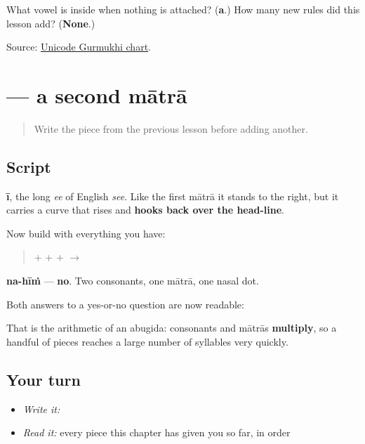 \begin{tcolorbox}[breakable,colback=teal!4,colframe=teal!35!black,title={Before you move on}]
What vowel is inside \textbf{} when nothing is attached? (\textbf{a}.) How many new rules did this lesson add? (\textbf{None}.)

Source: \href{https://www.unicode.org/charts/PDF/U0A00.pdf}{Unicode Gurmukhi chart}.
\end{tcolorbox}
\section[\texorpdfstring{\pa{ੀ} (-ī)}{ੀ (-ī)}]{ — a second mātrā}

\label{lesson:PA-W01-ii-matra}



\begin{quote}
Write the piece from the previous lesson before adding another.
\end{quote}

\subsection*{Script}
\begin{quote}
\end{quote}

\textbf{ī}, the long \emph{ee} of English \emph{see}. Like the first mātrā it stands to the right, but it carries a curve that rises and \textbf{hooks back over the head-line}.

Now build with everything you have:

\begin{quote}
\textbf{} + \textbf{} + \textbf{} + \textbf{} $\to$ \textbf{}
\end{quote}

\textbf{na-hīṁ} — \textbf{no}. Two consonants, one mātrā, one nasal dot.

Both answers to a yes-or-no question are now readable:

\begin{quote}
\textbf{}   \textbf{}
\end{quote}

That is the arithmetic of an abugida: consonants and mātrās \textbf{multiply}, so a handful of pieces reaches a large number of syllables very quickly.

\subsection*{Your turn}
\begin{itemize}
\raggedright
  \item \emph{Write it:} 
  \item \emph{Read it:} every piece this chapter has given you so far, in order
\end{itemize}

